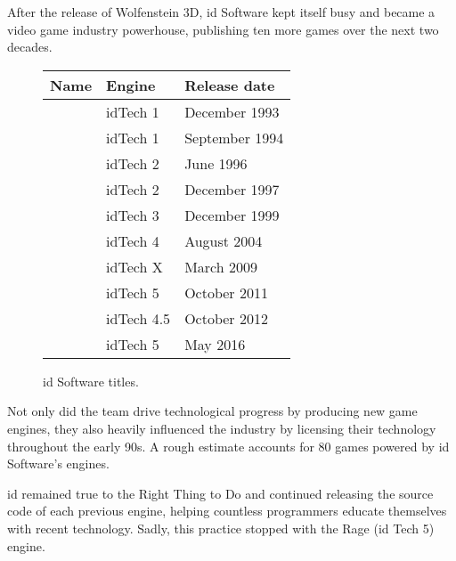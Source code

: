 After the release of Wolfenstein 3D, id Software kept itself busy and became a video game industry powerhouse, publishing ten more games over the next two decades. 
 \begin{figure}[H]
\centering  
\begin{tabularx}{\textwidth}{ X  Y Y }
  \toprule
  \textbf{Name} & \textbf{Engine}  & \textbf{Release date} \\
  \toprule {}\protect\footnotemark & idTech 1 & December 1993 \\ 
            & idTech 1 & September 1994 \\ 
            & idTech 2 &June 1996 \\ 
            & idTech 2 & December 1997 \\ 
            &  idTech 3 & December 1999 \\ 
            &  idTech 4 & August 2004 \\ 
            &  idTech X & March 2009 \\ 
            &  idTech 5 & October 2011 \\ 
            &  idTech 4.5 & October 2012 \\ 
            &  idTech 5 & May 2016 \\ 
  \toprule
\end{tabularx}
\caption{id Software titles.}\label{fig:vga_history}
\end{figure}
\par
Not only did the team drive technological progress by producing new game engines, they also heavily influenced the industry by licensing their technology throughout the early 90s. A rough estimate accounts for 80 games powered by id Software's engines.\\
\par
id remained true to the Right Thing to Do and continued releasing the source code of each previous engine, helping countless programmers educate themselves with recent technology. Sadly, this practice stopped with the Rage (id Tech 5) engine.
\par
